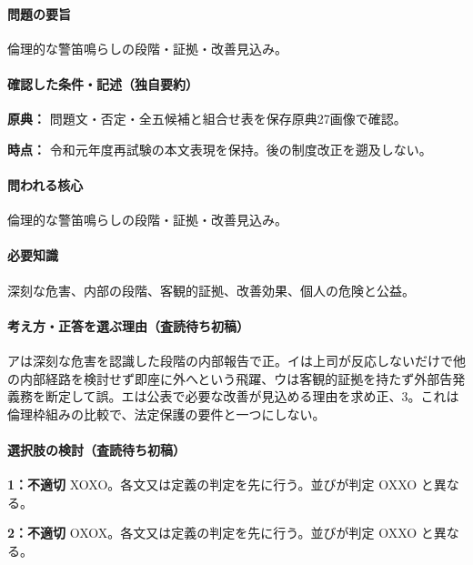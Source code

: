 \paragraph{問題の要旨} 倫理的な警笛鳴らしの段階・証拠・改善見込み。

\paragraph{確認した条件・記述（独自要約）}\mbox{}\par

\noindent\textbf{原典：} 問題文・否定・全五候補と組合せ表を保存原典27画像で確認。\par

\noindent\textbf{時点：} 令和元年度再試験の本文表現を保持。後の制度改正を遡及しない。\par

\paragraph{問われる核心} 倫理的な警笛鳴らしの段階・証拠・改善見込み。

\paragraph{必要知識} 深刻な危害、内部の段階、客観的証拠、改善効果、個人の危険と公益。

\paragraph{考え方・正答を選ぶ理由（査読待ち初稿）} アは深刻な危害を認識した段階の内部報告で正。イは上司が反応しないだけで他の内部経路を検討せず即座に外へという飛躍、ウは客観的証拠を持たず外部告発義務を断定して誤。エは公表で必要な改善が見込める理由を求め正、3。これは倫理枠組みの比較で、法定保護の要件と一つにしない。

\paragraph{選択肢の検討（査読待ち初稿）}\mbox{}\par

\noindent\textbf{1：不適切} XOXO。各文又は定義の判定を先に行う。並びが判定 OXXO と異なる。\par

\noindent\textbf{2：不適切} OXOX。各文又は定義の判定を先に行う。並びが判定 OXXO と異なる。\par

